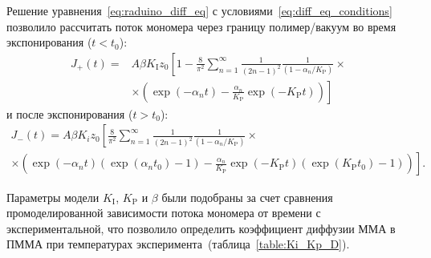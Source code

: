 Решение уравнения~\ref{eq:raduino_diff_eq} с условиями~\ref{eq:diff_eq_conditions} позволило рассчитать поток мономера через границу полимер/вакуум во время экспонирования ($t < t_0$):
\begin{equation}
	\begin{aligned}
		J_{+}(t)= & A \beta K_\mathrm{I} z_0
		\left[
		1 - \frac{8}{\pi^2} \sum_{n=1}^{\infty}
		\frac{1}{(2n-1)^2} \frac{1}{(1 - \alpha_n / K_\mathrm{P})} \times \right. \\ & \left.
		\times
		\left(
			\exp (-\alpha_n t)-\frac{\alpha_n}{K_\mathrm{P}} \exp (-K_\mathrm{P} t)
		\right)
		\right]
	\end{aligned}
\end{equation}
и после экспонирования ($t > t_0$):
\begin{equation}
	\begin{aligned}
		J_{-}(t)= A \beta K_i z_0 \left[
			\frac{8}{\pi^2} \sum_{n=1}^{\infty} \frac{1}{(2 n-1)^2} \frac{1}{\left(1-\alpha_n / K_\mathrm{P}\right)}\right. \times \quad \quad \quad \quad \\
	\times \left.
	\left(
	\exp (-\alpha_n t) (\exp (\alpha_n t_0)-1)- \frac{\alpha_n}{K_\mathrm{P}}
	\exp (-K_\mathrm{P} t) (\exp (K_\mathrm{P} t_0)-1)
	\right)
	\right].
	\end{aligned}
\end{equation}

Параметры модели $K_\mathrm{I}$, $K_\mathrm{P}$ и $\beta$ были подобраны за счет сравнения промоделированной зависимости потока мономера от времени с экспериментальной, что позволило определить коэффициент диффузии ММА в ПММА при температурах эксперимента~(таблица~\ref{table:Ki_Kp_D}).

